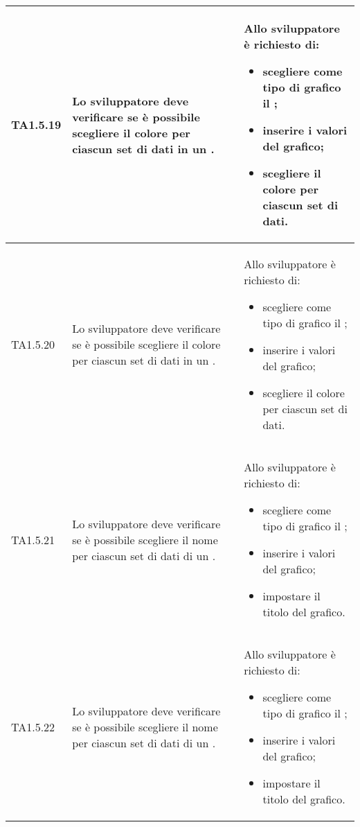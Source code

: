 \begin{longtabu}{| X[0.5] | X | X |}
	TA1.5.19 & Lo sviluppatore deve verificare se è possibile scegliere il colore per ciascun set di dati in un .

		& Allo sviluppatore è richiesto di:
		\begin{itemize}
			\item scegliere come tipo di grafico il ;
			\item inserire i valori del grafico;
			\item scegliere il colore per ciascun set di dati.
		\end{itemize}
\\ \hline

	TA1.5.20 & Lo sviluppatore deve verificare se è possibile scegliere il colore per ciascun set di dati in un .

		& Allo sviluppatore è richiesto di:
		\begin{itemize}
			\item scegliere come tipo di grafico il ;
			\item inserire i valori del grafico;
			\item scegliere il colore per ciascun set di dati.
		\end{itemize}
\\ \hline

	TA1.5.21 & Lo sviluppatore deve verificare se è possibile scegliere il nome per ciascun set di dati di un .

		& Allo sviluppatore è richiesto di:
		\begin{itemize}
			\item scegliere come tipo di grafico il ;
			\item inserire i valori del grafico;
			\item impostare il titolo del grafico.
		\end{itemize}
\\ \hline

	TA1.5.22 & Lo sviluppatore deve verificare se è possibile scegliere il nome per ciascun set di dati di un .

		& Allo sviluppatore è richiesto di:
		\begin{itemize}
			\item scegliere come tipo di grafico il ;
			\item inserire i valori del grafico;
			\item impostare il titolo del grafico.
		\end{itemize}
\\ \hline


\end{longtabu}
